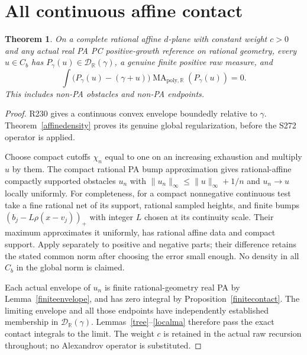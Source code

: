 \documentclass[11pt]{article}
\newtheorem{theorem}{Theorem}
\newcommand{\R}{\mathbb R}
\newcommand{\MA}{\operatorname{MA}_{\mathrm{poly},\R}}
\newcommand{\D}{\mathcal D_\R(\gamma)}
\begin{document}
\section{All continuous affine contact}
\begin{theorem}\label{affinecontact}
On a complete rational affine $d$-plane with constant weight $c>0$
and any actual real PA PC positive-growth reference on rational geometry,
\emph{every} $u\in C_b$ has $P_\gamma(u)\in\D$, a genuine finite
positive raw measure, and
\[
 \int\bigl(P_\gamma(u)-(\gamma+u)\bigr)\MA(P_\gamma(u))=0.
\]
This includes non-PA obstacles and non-PA endpoints.
\end{theorem}
\begin{proof}
R230 gives a continuous convex envelope boundedly relative to
$\gamma$. Theorem~\ref{affinedensity} proves its genuine global
regularization, before the S272 operator is applied.

Choose compact cutoffs $\chi_n$ equal to one on an increasing
exhaustion and multiply $u$ by them. The compact rational PA bump
approximation gives rational-affine compactly supported obstacles
$u_n$ with $\|u_n\|_\infty\leq\|u\|_\infty+1/n$ and
$u_n\to u$ locally uniformly. For completeness, for a compact
nonnegative continuous test take a fine rational net of its support,
rational sampled heights, and finite bumps
$(b_j-L\rho(x-v_j))_+$ with integer $L$ chosen at its continuity
scale. Their maximum approximates it uniformly, has rational affine
data and compact support. Apply separately to positive and negative
parts; their difference retains the stated common norm after choosing
the error small enough. No density in all $C_b$ in the global norm
is claimed.

Each actual envelope of $u_n$ is finite rational-geometry real PA by
Lemma~\ref{finiteenvelope}, and has zero integral by
Proposition~\ref{finitecontact}. The limiting envelope and all those
endpoints have independently established membership in $\D$.
Lemmas~\ref{tree}--\ref{localma} therefore pass the exact contact
integrals to the limit. The weight $c$ is retained in the actual
raw recursion throughout; no Alexandrov operator is substituted.
\end{proof}
\end{document}
